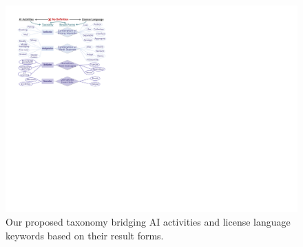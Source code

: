 \begin{figure}[t]
    \centering
    \includegraphics[width=\linewidth]{fig/taxonomy.pdf}
    \caption{Our proposed taxonomy bridging AI activities and license language keywords based on their result forms.}
    \Description{}
    \label{fig:tax}
    \vspace{-5mm}
\end{figure}


